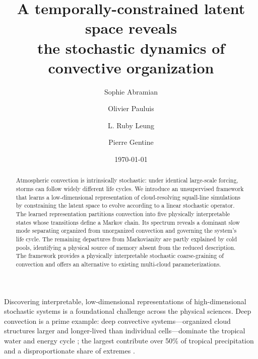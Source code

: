 \documentclass[
    aps,
    prl,
    reprint,
    superscriptaddress,
    amsmath,amssymb,
    floatfix,
    nofootinbib
]{revtex4-2}
\begin{document}
\title{A temporally-constrained latent space reveals \\ 
the stochastic dynamics of convective organization}

\author{Sophie Abramian}

\author{Olivier Pauluis}

\author{L. Ruby Leung}


\author{Pierre Gentine}




\date{\today}

\begin{abstract}
Atmospheric convection is intrinsically stochastic: under identical large-scale forcing, storms can follow widely different life cycles. We introduce an unsupervised framework that learns a low-dimensional representation of cloud-resolving squall-line simulations by constraining the latent space to evolve according to a linear stochastic operator. The learned representation partitions convection into five physically interpretable states whose transitions define a Markov chain. Its spectrum reveals a dominant slow mode separating organized from unorganized convection and governing the system's life cycle. The remaining departures from Markovianity are partly explained by cold pools, identifying a physical source of memory absent from the reduced description. The framework provides a physically interpretable stochastic coarse-graining of convection and offers an alternative to existing multi-cloud parameterizations.
\end{abstract}

\maketitle

Discovering interpretable, low-dimensional representations of high-dimensional stochastic systems is a foundational challenge across the physical sciences. Deep convection is a prime example: deep convective systems---organized cloud structures larger and longer-lived than individual cells---dominate the tropical water and energy cycle \cite{houze2004mesoscale, chakraborty2023overview}; the largest contribute over 50\% of tropical precipitation and a disproportionate share of extremes \cite{roca2020extreme, feng2024mesoscale, feng2023mesoscale}.
\end{document}
